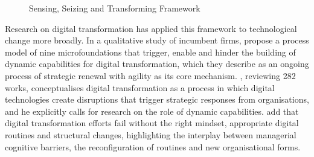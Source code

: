 \begin{figure}[H]
  \centering
  \caption{Sensing, Seizing and Transforming Framework}
  \label{fig:sst}
\end{figure}

Research on digital transformation has applied this framework to technological change more broadly. In a qualitative study of incumbent firms, \textcite[326]{warner2019} propose a process model of nine microfoundations that trigger, enable and hinder the building of dynamic capabilities for digital transformation, which they describe as an ongoing process of strategic renewal with agility as its core mechanism. \textcite[118]{vial2019}, reviewing 282 works, conceptualises digital transformation as a process in which digital technologies create disruptions that trigger strategic responses from organisations, and he explicitly calls for research on the role of dynamic capabilities. \textcite[1]{volberda2021} add that digital transformation efforts fail without the right mindset, appropriate digital routines and structural changes, highlighting the interplay between managerial cognitive barriers, the reconfiguration of routines and new organisational forms.

